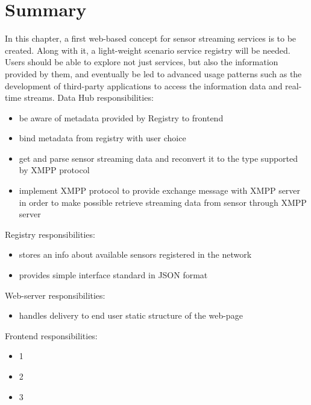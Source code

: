 \section{Summary}
	In this chapter, a first web-based concept for sensor streaming services is to be created. Along with it, a light-weight scenario service registry will be needed. Users should be able to explore not just services, but also the information provided by them, and eventually be led to advanced usage patterns such as the development of third-party applications to access the information data and real-time streams.
  \newline
  Data Hub responsibilities:
  \begin{itemize}
  \item be aware of metadata provided by Registry to frontend
  \item bind metadata from registry with user choice
  \item get and parse sensor streaming data and reconvert it to the type supported by XMPP protocol
  \item implement XMPP protocol to provide exchange message with XMPP server in order to make possible retrieve streaming data from sensor through XMPP server
  \end{itemize}
  Registry responsibilities:
  \begin{itemize}
  \item stores an info about available sensors registered in the network
  \item provides simple interface standard in JSON format
  \end{itemize}
  Web-server responsibilities:
  \begin{itemize}
  \item handles delivery to end user static structure of the web-page
  \end{itemize}
  Frontend responsibilities:
  \begin{itemize}
  \item 1
  \item 2
  \item 3
  \end{itemize}